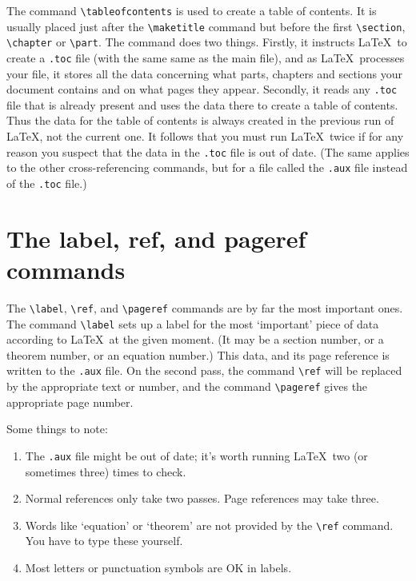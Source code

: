 \documentclass[a4paper]{article}
\begin{document}
The command \verb|\tableofcontents| is used to create a table
of contents.  It is usually placed just after the 
\verb|\maketitle| command but before the first \verb|\section|,
\verb|\chapter| or \verb|\part|.  The command does two
things.  Firstly, it instructs \LaTeX\ to create a \texttt{.toc}
file (with the same same as the main file), and as \LaTeX\ processes
your file, it stores all the data concerning what parts, chapters
and sections your document contains and on what pages they appear.
Secondly, it reads any \texttt{.toc} file that is already present
and uses the data there to create a table of contents.  Thus
the data for the table of contents is always created in the previous
run of \LaTeX, not the current one.  It follows that you must
run \LaTeX\ twice if for any reason you suspect that the
data in the \texttt{.toc} file is out of date.  (The same applies
to the other cross-referencing commands, but for a file called
the \texttt{.aux} file instead of the \texttt{.toc} file.)

\section{The label, ref, and pageref commands}

The \verb|\label|, \verb|\ref|, and \verb|\pageref| commands
are by far the most important ones.  The command \verb|\label|
sets up a label for the most `important' piece of data according to
\LaTeX\ at the given moment.  (It may be a section number, or a theorem
number, or an equation number.)  This data, and its page reference
is written to the \texttt{.aux} file.  On the second pass, the command
\verb|\ref| will be replaced by the appropriate text or number,
and the command \verb|\pageref| gives the appropriate page number.

Some things to note:
\begin{enumerate}
\item The \texttt{.aux} file might be out of date; it's worth
running \LaTeX\ two (or sometimes three) times to check.  
\item Normal references only take two passes.  Page 
references may take three.
\item Words like `equation' or `theorem' are not provided by
the \verb|\ref| command.  You have to type these yourself.\label{typeyourself}
\item Most letters or punctuation symbols are OK in labels.
\end{enumerate}
\end{document}
